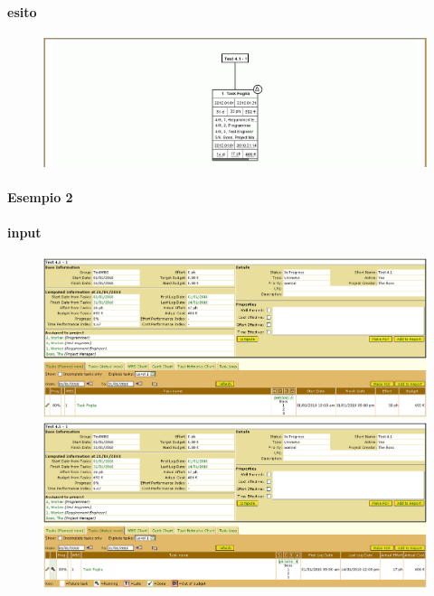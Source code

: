 \paragraph{esito}
\begin{figure}
\centering
\includegraphics[width=\textwidth]{tests/TEST_WBS/4.1/4.1_1/Esempio_1/output.png}
\end{figure}
\newpage
\paragraph{Esempio 2}
\paragraph{input}
\begin{figure}
\centering
\includegraphics[width=\textwidth]{tests/TEST_WBS/4.1/4.1_1/Esempio_2/input.png}
\includegraphics[width=\textwidth]{tests/TEST_WBS/4.1/4.1_1/Esempio_2/input_actual.png}
\end{figure}
\newpage

